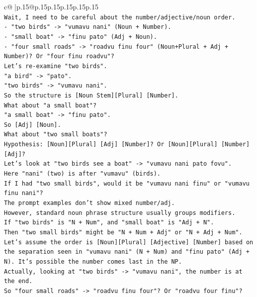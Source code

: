 \documentclass{article}
\begin{document}
{\begin{supertabular}{c@{$\;$}|p{.15\linewidth}@{}p{.15\linewidth}p{.15\linewidth}p{.15\linewidth}p{.15\linewidth}p{.15\linewidth}}
{{{\\ 
\texttt{Wait, I need to be careful about the number/adjective/noun order.} \\
\texttt{{-} "two birds" {-}> "vumavu nani" (Noun + Number).} \\
\texttt{{-} "small boat" {-}> "finu pato" (Adj + Noun).} \\
\texttt{{-} "four small roads" {-}> "roadvu finu four" (Noun+Plural + Adj + Number)? Or "four finu roadvu"?} \\
\texttt{Let's re{-}examine "two birds".} \\
\texttt{"a bird" {-}> "pato".} \\
\texttt{"two birds" {-}> "vumavu nani".} \\
\texttt{So the structure is {[}Noun Stem{]}{[}Plural{]} {[}Number{]}.} \\
\texttt{What about "a small boat"?} \\
\texttt{"a small boat" {-}> "finu pato".} \\
\texttt{So {[}Adj{]} {[}Noun{]}.} \\
\texttt{What about "two small boats"?} \\
\texttt{Hypothesis: {[}Noun{]}{[}Plural{]} {[}Adj{]} {[}Number{]}? Or {[}Noun{]}{[}Plural{]} {[}Number{]} {[}Adj{]}?} \\
\texttt{Let's look at "two birds see a boat" {-}> "vumavu nani pato fovu".} \\
\texttt{Here "nani" (two) is after "vumavu" (birds).} \\
\texttt{If I had "two small birds", would it be "vumavu nani finu" or "vumavu finu nani"?} \\
\texttt{The prompt examples don't show mixed number/adj.} \\
\texttt{However, standard noun phrase structure usually groups modifiers.} \\
\texttt{If "two birds" is "N + Num", and "small boat" is "Adj + N".} \\
\texttt{Then "two small birds" might be "N + Num + Adj" or "N + Adj + Num".} \\
\texttt{Let's assume the order is {[}Noun{]}{[}Plural{]} {[}Adjective{]} {[}Number{]} based on the separation seen in "vumavu nani" (N + Num) and "finu pato" (Adj + N). It's possible the number comes last in the NP.} \\
\texttt{Actually, looking at "two birds" {-}> "vumavu nani", the number is at the end.} \\
\texttt{So "four small roads" {-}> "roadvu finu four"? Or "roadvu four finu"?} \\
}}}
\end{supertabular}}
\end{document}
